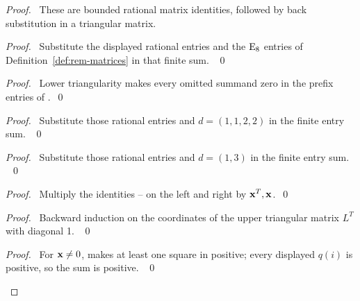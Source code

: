 \begin{proof}
\pfsketch\ These are bounded rational matrix identities, followed by
back substitution in a triangular matrix.
\begin{proof}\pf\ Substitute the displayed rational entries and the
$\mathrm{E}_8$ entries of Definition~\ref{def:rem-matrices} in that finite sum. ~\qed\end{proof}
\begin{proof}\pf\ Lower triangularity makes every omitted summand
zero in the prefix entries of .~\qed\end{proof}
\begin{proof}\pf\ Substitute those rational entries and $d=(1,1,2,2)$
in the finite entry sum. ~\qed\end{proof}
\begin{proof}\pf\ Substitute those rational entries and $d=(1,3)$
in the finite entry sum. ~\qed\end{proof}
\begin{proof}\pf\ Multiply the identities
-- on the left and right by ${\mathbf x}^T,{\mathbf x}$.~\qed\end{proof}
\begin{proof}\pf\ Backward induction on the coordinates of the upper
triangular matrix $L^T$ with diagonal 1. ~\qed\end{proof}
\qedstep
\begin{proof}\pf\ For ${\mathbf x}\ne0$,  makes at least
one square in  positive; every displayed $q(i)$ is
positive, so the sum is positive. ~\qed\end{proof}
\end{proof}

